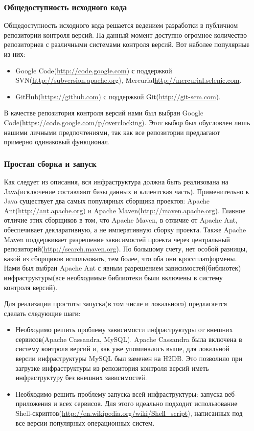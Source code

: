 \documentclass[12pt,a4paper]{extarticle}
\begin{document}
\subsubsection{Общедоступность исходного кода}
Общедоступность исходного кода решается ведением разработки в публичном репозитории контроля версий. На данный момент доступно огромное количество репозиториев с различными системами контроля версий. Вот наболее популярные из них:
\begin{itemize}
	\item Google Code(\url{http://code.google.com}) с поддержкой SVN(\url{http://subversion.apache.org}), Mercurial{\url{http://mercurial.selenic.com}}.
	\item GitHub(\url{https://github.com}) с поддержкой Git(\url{http://git-scm.com}).
\end{itemize}
В качестве репозитория контроля версий нами был выбран Google Code(\url{https://code.google.com/p/overclocking}). Этот выбор был обусловлен лишь нашими личными предпочтениями, так как все репозитории предлагают примерно одинаковый функционал.

\subsubsection{Простая сборка и запуск}
Как следует из описания, вся инфраструктура должна быть реализована на Java(исключение составляют базы данных и клиентская часть). Применительно к Java существует два самых популярных сборщика проектов: Apache Ant(\url{http://ant.apache.org}) и Apache Maven(\url{http://maven.apache.org}). Главное отличие этих сборщиков в том, что Apache Maven, в отличие от Apache Ant, обеспечивает декларативную, а не императивную сборку проекта. Также Apache Maven поддерживает разрешение зависимостей проекта через центральный репозиторий(\url{http://search.maven.org}). По большому счету, нет особой разницы, какой из сборщиков использовать, тем более, что оба они кроссплатформены. Нами был выбран Apache Ant с явным разрешением зависимостей(библиотек) инфраструктуры(все необходимые библиотеки были включены в систему контроля версий).

Для реализации простоты запуска(в том числе и локального) предлагается сделать следующие шаги:
\begin{itemize}
	\item Необходимо решить проблему зависимости инфраструктуры от внешних сервисов(Apache Cassandra, MySQL). Apache Cassandra была включена в систему контроля версий и, как уже упоминалось выше, для локальной версии инфраструктуры MySQL был заменен на H2DB. Это позволило при загрузке инфраструктуры из репозитория контроля версий иметь инфраструктуру без внешних зависимостей.
	\item Необходимо решить проблему запуска всей инфраструктуры: запуска веб-приложения и всех сервисов. Для этого идеально подходит использование Shell-скриптов(\url{http://en.wikipedia.org/wiki/Shell_script}), написанных под все версии популярных операционных систем. 
\end{itemize}
\end{document}
